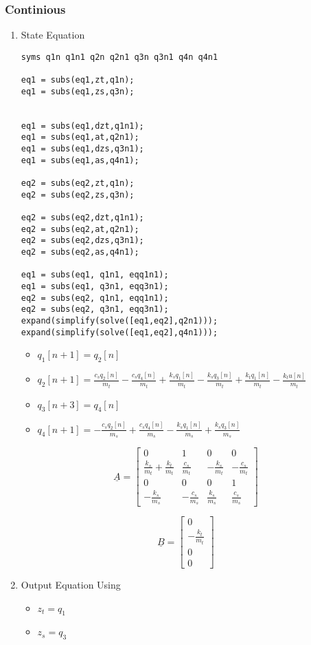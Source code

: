 \documentclass[11pt]{article}
\begin{document}
\subsubsection{Continious}
\label{sec:org0865f7d}
\begin{enumerate}
\item State Equation
\label{sec:org2c185c4}
\begin{verbatim}
syms q1n q1n1 q2n q2n1 q3n q3n1 q4n q4n1

eq1 = subs(eq1,zt,q1n);
eq1 = subs(eq1,zs,q3n);


eq1 = subs(eq1,dzt,q1n1);
eq1 = subs(eq1,at,q2n1);
eq1 = subs(eq1,dzs,q3n1);
eq1 = subs(eq1,as,q4n1);

eq2 = subs(eq2,zt,q1n);
eq2 = subs(eq2,zs,q3n);

eq2 = subs(eq2,dzt,q1n1);
eq2 = subs(eq2,at,q2n1);
eq2 = subs(eq2,dzs,q3n1);
eq2 = subs(eq2,as,q4n1);

eq1 = subs(eq1, q1n1, eqq1n1);
eq1 = subs(eq1, q3n1, eqq3n1);
eq2 = subs(eq2, q1n1, eqq1n1);
eq2 = subs(eq2, q3n1, eqq3n1);
expand(simplify(solve([eq1,eq2],q2n1)));
expand(simplify(solve([eq1,eq2],q4n1)));

\end{verbatim}


\begin{itemize}
\item \(q_1[n+1]=q_2[n]\)
\item \(q_2[n+1]=\frac{c_s q_2[n]}{m_t} - \frac{c_s q_4[n]}{m_t} + \frac{k_s q_1[n]}{m_t} - \frac{k_s q_3[n]}{m_t} + \frac{k_t q_1[n]}{m_t} - \frac{k_t u[n]}{m_t}\)
\item \(q_3[n+3]=q_4[n]\)
\item \(q_4[n+1]=-\frac{c_s q_2[n]}{m_s} + \frac{c_s q_4[n]}{m_s} - \frac{k_s q_1[n]}{m_s} + \frac{k_s q_3[n]}{m_s}\)
\end{itemize}

\[\underline{A} = \begin{bmatrix}
0 & 1 & 0 & 0 \\
\frac{k_s}{m_t}+ \frac{k_t }{m_t} & \frac{c_s }{m_t} &  - \frac{k_s }{m_t} &  - \frac{c_s }{m_t} \\
0 & 0 & 0 & 1 \\
-\frac{k_s }{m_s} & -\frac{c_s }{m_s} & \frac{k_s }{m_s} & \frac{c_s }{m_s}
\end{bmatrix}\]

\[\underline{B} = \begin{bmatrix}
0 \\
-\frac{k_t}{m_t} \\
0 \\
0
\end{bmatrix}\]
\item Output Equation
\label{sec:org566e23b}
Using
\begin{itemize}
\item \(z_t=q_1\)
\item \(z_s=q_3\)
\end{itemize}


\end{enumerate}
\end{document}
